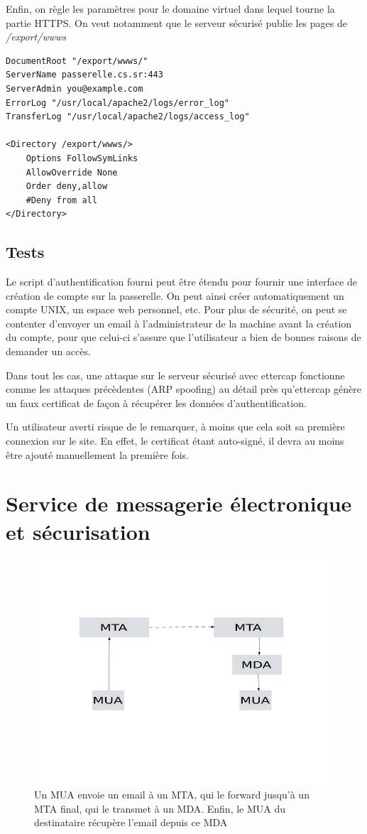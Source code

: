 \documentclass[a4paper]{article}
\begin{document}
Enfin, on règle les paramètres pour le domaine virtuel dans lequel
tourne la partie HTTPS. On veut notamment que le serveur sécurisé
publie les pages de \textit{/export/wwws}
\begin{verbatim}
DocumentRoot "/export/wwws/"
ServerName passerelle.cs.sr:443
ServerAdmin you@example.com
ErrorLog "/usr/local/apache2/logs/error_log"
TransferLog "/usr/local/apache2/logs/access_log"

<Directory /export/wwws/>
    Options FollowSymLinks
    AllowOverride None
    Order deny,allow
    #Deny from all
</Directory>
\end{verbatim}

\subsection{Tests}
Le script d'authentification fourni peut être étendu pour
fournir une interface de création de compte sur la passerelle.
On peut ainsi créer automatiquement un compte UNIX, un espace
web personnel, etc. Pour plus de sécurité, on peut se contenter
d'envoyer un email à l'administrateur de la machine avant la
création du compte, pour que celui-ci s'assure que l'utilisateur
a bien de bonnes raisons de demander un accès.

Dans tout les cas, une attaque sur le serveur sécurisé avec
ettercap fonctionne comme les attaques précèdentes (ARP spoofing)
au détail près qu'ettercap génère un faux certificat de façon
à récupérer les données d'authentification.

Un utilisateur averti risque de le remarquer, à moins que cela
soit sa première connexion sur le site. En effet, le certificat
étant auto-signé, il devra au moins être ajouté manuellement
la première fois.
\section{Service de messagerie électronique et sécurisation}
\begin{figure}[!ht]
	\centering
	\includegraphics[scale=.5]{emailrouting.png}
	\caption{\label{emailrouting} Un MUA envoie un email à un MTA, qui
		le forward jusqu'à un MTA final, qui le transmet à un MDA.
		Enfin, le MUA du destinataire récupère l'email depuis ce MDA}
\end{figure}
\end{document}
